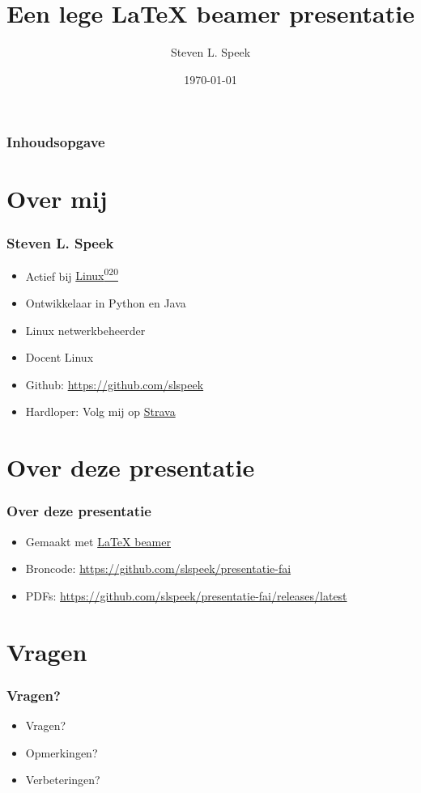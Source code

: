 \documentclass{beamer}
\title[\LaTeX{} beamer sjabloon] %
{Een lege \LaTeX{} beamer presentatie}
\author[S.L.Speek] %
{Steven L. Speek}
\institute[NLLGG] %
{
  Nederlandse Linux Gebruikers Groep 
}
\date[\today{}] %
{\today{}}
\begin{document}
\frame{\titlepage}


\begin{frame}
\frametitle{Inhoudsopgave}
\tableofcontents
\end{frame}


\section{Over mij}

\begin{frame}
\frametitle{Steven L. Speek}
\begin{itemize}
  \item Actief bij \href{https://linux020.nl/}{Linux\textsuperscript{020}}
  \item Ontwikkelaar in Python en Java  
  \item Linux netwerkbeheerder
  \item Docent Linux
  \item Github: \url{https://github.com/slspeek}
  \item Hardloper: Volg mij op \href{https://www.strava.com/athletes/123214921}{Strava}
\end{itemize}

\end{frame}
\section{Over deze presentatie}

\begin{frame}
\frametitle{Over deze presentatie}
\begin{itemize}
  \item Gemaakt met \href{https://nl.mirrors.cicku.me/ctan/macros/latex/contrib/beamer/doc/beameruserguide.pdf}{\LaTeX{} beamer}
  \item Broncode: \url{https://github.com/slspeek/presentatie-fai}
  \item PDFs: \url{https://github.com/slspeek/presentatie-fai/releases/latest}
\end{itemize}

\end{frame}

\section{Vragen}
\begin{frame}
\frametitle{Vragen?}
\begin{itemize}
  \item<2-> Vragen?
  \item<3-> Opmerkingen?
  \item<4-> Verbeteringen?
\end{itemize}
\end{frame}
\end{document}
